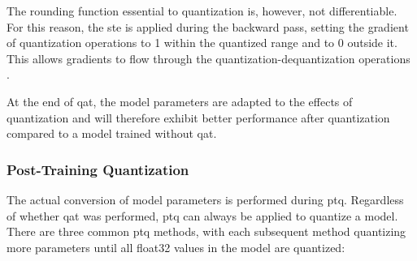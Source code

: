 {The rounding function essential to quantization is, however, not differentiable. For this reason, the \gls{ste} is applied during the backward pass,
setting the gradient of quantization operations to 1 within the quantized range and to 0 outside it.
This allows gradients to flow through the quantization-dequantization operations \cite{qatBackwardPass}.

At the end of \gls{qat}, the model parameters are adapted to the effects of quantization and will therefore exhibit better performance after quantization compared to a model trained without \gls{qat}.


\subsubsection{Post-Training Quantization}

The actual conversion of model parameters is performed during \gls{ptq}.
Regardless of whether \gls{qat} was performed, \gls{ptq} can always be applied to quantize a model.
There are three common \gls{ptq} methods, with each subsequent method quantizing more parameters until all \gls{float32} values in the model are quantized:

}
